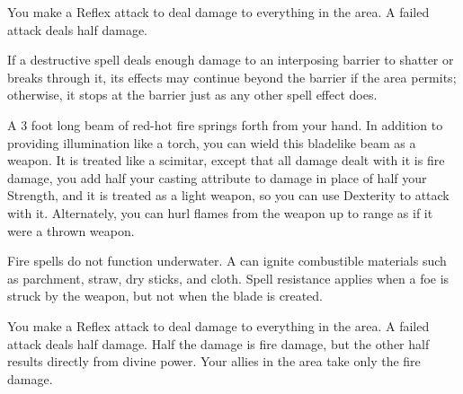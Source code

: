 \spellrng{\rngmed}
\begin{spelleffect}
    You make a Reflex attack to deal damage to everything in the area. A failed attack deals half damage.
\end{spelleffect}
\begin{spellnotes}
  If a destructive spell deals enough damage to an interposing barrier to shatter or breaks through it, its effects may continue beyond the barrier if the area permits; otherwise, it stops at the barrier just as any other spell effect does.
\end{spellnotes}

\begin{spelleffect}
  A 3 foot long beam of red-hot fire springs forth from your hand. In addition to providing illumination like a torch, you can wield this bladelike beam as a weapon. It is treated like a scimitar, except that all damage dealt with it is fire damage, you add half your casting attribute to damage in place of half your Strength, and it is treated as a light weapon, so you can use Dexterity to attack with it. Alternately, you can hurl flames from the weapon up to \rngmed range as if it were a thrown weapon.
\end{spelleffect}
\begin{spellnotes}
  Fire spells do not function underwater. A  can ignite combustible materials such as parchment, straw, dry sticks, and cloth. Spell resistance applies when a foe is struck by the weapon, but not when the blade is created.
\end{spellnotes}

\spellrng{\rngclose}
\begin{spelleffect}
    You make a Reflex attack to deal damage to everything in the area. A failed attack deals half damage. Half the damage is fire damage, but the other half results directly from divine power. Your allies in the area take only the fire damage.
\end{spelleffect}

